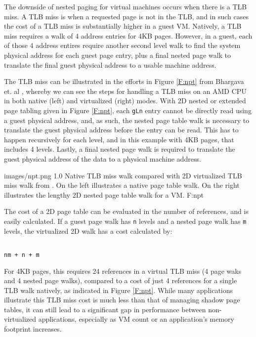 The downside of nested paging for virtual machines occurs when there is a TLB miss. A TLB miss is when a requested page is not in the TLB, and in such cases the cost of a TLB miss is substantially higher in a guest VM. Natively, a TLB miss requires a walk of 4 address entries for 4KB pages. However, in a guest, each of those 4 address entires require another second level walk to find the system physical address for each guest page entry, plus a final nested page walk to translate the final guest physical address to a usable machine address.  

The TLB miss can be illustrated in the efforts in Figure \ref{F:npt} from Bhargava et. al \cite{bhargava2008npt}, whereby we can see the steps for handling a TLB miss on an AMD CPU in both native (left) and virtualized (right) modes. With 2D nested or extended page tabling given in Figure \ref{F:npt}, each \verb|gLn| entry cannot be directly read using a guest physical address, and, as such, the nested page table walk is necessary to translate the guest physical address before the entry can be read. This has to happen recursively for each level, and in this example with 4KB pages, that includes 4 levels. Lastly, a final nested page walk is required to translate the guest physical address of the data to a physical machine address.  

  {images/npt.png}
  {1.0}
  {Native TLB miss walk compared with 2D virtualized TLB miss walk from \cite{bhargava2008npt}. On the left illustrates a native page table walk. On the right illustrates the lengthy 2D nested page table walk for a VM.}
  {F:npt}


The cost of a 2D page table can be evaluated in the number of references, and is easily calculated. If a guest page walk has \verb|n| levels and a nested page walk has \verb|m| levels, the virtualized 2D walk has a cost calculated by:
 
\begin{verbatim}

nm + n + m
\end{verbatim}


For 4KB pages, this requires 24 references in a virtual TLB miss (4 page waks and 4 nested page walks), compared to a cost of just 4 references for a single TLB walk natively, as indicated in Figure \ref{F:npt}. While many applications illustrate this TLB miss cost is much less than that of managing shadow page tables, it can still lead to a significant gap in performance between non-virtualized applications, especially as VM count or an application's memory footprint increases. 

